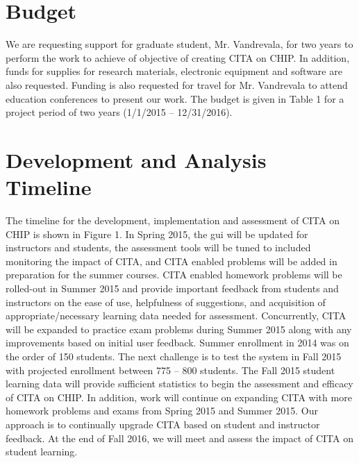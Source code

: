 \section{Budget}

We are requesting support for graduate student, Mr. Vandrevala, for two years to perform the
work to achieve of objective of creating CITA on CHIP. In addition, funds for supplies for
research materials, electronic equipment and software are also requested. Funding is also
requested for travel for Mr. Vandrevala to attend education conferences to present our work.
The budget is given in Table 1 for a project period of two years (1/1/2015 – 12/31/2016).

\section{Development and Analysis Timeline}

The timeline for the development, implementation and assessment of CITA on CHIP is shown in Figure 1. In Spring 2015, the \gls{gui} will be updated for instructors and students, the
assessment tools will be tuned to included monitoring the impact of CITA, and CITA enabled
problems will be added in preparation for the summer courses. CITA enabled homework
problems will be rolled-out in Summer 2015 and provide important feedback from students and
instructors on the ease of use, helpfulness of suggestions, and acquisition of
appropriate/necessary learning data needed for assessment. Concurrently, CITA will be
expanded to practice exam problems during Summer 2015 along with any improvements based
on initial user feedback. Summer enrollment in 2014 was on the order of 150 students. The next
challenge is to test the system in Fall 2015 with projected enrollment between 775 – 800
students. The Fall 2015 student learning data will provide sufficient statistics to begin the
assessment and efficacy of CITA on CHIP. In addition, work will continue on expanding CITA
with more homework problems and exams from Spring 2015 and Summer 2015. Our approach
is to continually upgrade CITA based on student and instructor feedback. At the end of Fall
2016, we will meet and assess the impact of
CITA on student learning.

